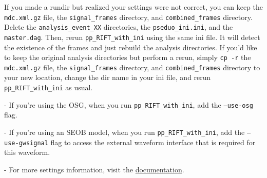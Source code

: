 \documentclass{article}
\begin{document}
If you made a rundir but realized your settings were not correct, you can keep the \texttt{mdc.xml.gz} file, the \texttt{signal\_frames} directory, and \texttt{combined\_frames} directory. Delete the \texttt{analysis\_event\_XX} directories, the \texttt{pseduo\_ini.ini}, and the \texttt{master.dag}. Then, rerun \texttt{pp\_RIFT\_with\_ini} using the same ini file. It will detect the existence of the frames and just rebuild the analysis directories. If you'd like to keep the original analysis directories but perform a rerun, simply \texttt{cp -r} the \texttt{mdc.xml.gz} file, the \texttt{signal\_frames} directory, and \texttt{combined\_frames} directory to your new location, change the dir name in your ini file, and rerun \texttt{pp\_RIFT\_with\_ini} as usual.

\noindent - If you're using the OSG, when you run \texttt{pp\_RIFT\_with\_ini}, add the \texttt{--use-osg} flag.

\noindent - If you're using an SEOB model, when you run \texttt{pp\_RIFT\_with\_ini}, add the \texttt{--use-gwsignal} flag to access the external waveform interface that is required for this waveform.

\noindent - For more settings information, visit the \href{https://rift-documentation.readthedocs.io/en/latest/index.html}{documentation}.
\end{document}
